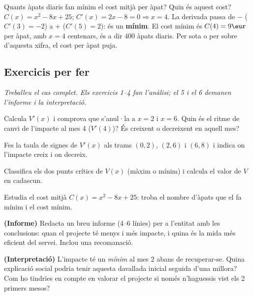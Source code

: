 \begin{exresolt}
Quants àpats diaris fan mínim el cost mitjà per àpat? Quin és aquest cost?
\solucio
$C(x)=x^2-8x+25$; $C'(x)=2x-8=0\Rightarrow x=4$. La derivada passa de $-$ ($C'(3)=-2$) a
$+$ ($C'(5)=2$): és un \textbf{mínim}. El cost mínim és $C(4)=9\eur$ per àpat, amb
$x=4$ centenars, és a dir $400$ àpats diaris. Per sota o per sobre d'aquesta xifra, el
cost per àpat puja.
\end{exresolt}

\subsection{Exercicis per fer}

\noindent\textit{Treballeu el cas complet. Els exercicis 1--4 fan l'anàlisi; el 5 i el 6
demanen l'informe i la interpretació.}

\begin{exercicis}
\begin{exlist}
  \item Calcula $V'(x)$ i comprova que s'anul·la a $x=2$ i $x=6$. Quin és el ritme de
        canvi de l'impacte al mes 4 ($V'(4)$)? És creixent o decreixent en aquell mes?
  \item Fes la taula de signes de $V'(x)$ als trams $(0,2)$, $(2,6)$ i $(6,8)$ i indica
        on l'impacte creix i on decreix.
  \item Classifica els dos punts crítics de $V(x)$ (màxim o mínim) i calcula el valor de
        $V$ en cadascun.
  \item Estudia el cost mitjà $C(x)=x^2-8x+25$: troba el nombre d'àpats que el fa mínim
        i el cost mínim.
  \item \textbf{(Informe)} Redacta un breu informe (4--6 línies) per a l'entitat amb les
        conclusions: quan el projecte té menys i més impacte, i quina és la mida més
        eficient del servei. Inclou una recomanació.
  \item \textbf{(Interpretació)} L'impacte té un \emph{mínim} al mes 2 abans de
        recuperar-se. Quina explicació social podria tenir aquesta davallada inicial
        seguida d'una millora? Com ho tindries en compte en valorar el projecte si només
        n'haguessis vist els 2 primers mesos?
\end{exlist}
\end{exercicis}

